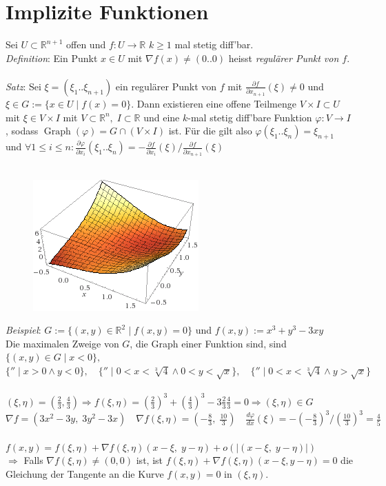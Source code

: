 \documentclass[12pt,a4paper,titlepage]{article}
\renewcommand{\d}{\partial}
\newcommand{\setR}{\mathbb{R}}
\newcommand{\Graph}{\operatorname{Graph}}
\begin{document}
\section*{Implizite Funktionen}
Sei $U\subset\setR^{n+1}$ offen und $f:U\to\setR$ $k\geq 1$ mal stetig diff'bar. \\
\textit{Definition}: Ein Punkt $x\in U$ mit $\nabla f(x)\neq(0..0)$ heisst \emph{regulärer Punkt von $f$}. \\
\\
\textit{Satz}: Sei $\xi=(\xi_1..\xi_{n+1})$ ein regulärer Punkt von $f$ mit $\frac{\d f}{\d x_{n+1}}(\xi)\neq 0$ und \\
$\xi\in G:=\{x\in U\mid f(x)=0\}$. Dann existieren eine offene Teilmenge $V\times I\subset U$ mit $\xi\in V\times I$ mit $V\subset\setR^n,\; I\subset\setR$ und eine $k$-mal stetig diff'bare Funktion $\varphi:V\to I$, sodass $\Graph(\varphi)=G\cap(V\times I)$ ist. Für die gilt also $\varphi(\xi_1..\xi_n)=\xi_{n+1}$ und $\forall 1\leq i\leq n: \frac{\d\varphi}{\d x_i}(\xi_1..\xi_n)=-\frac{\d f}{\d x_i}(\xi)/\frac{\d f}{\d x_{n+1}}(\xi)$ \\
\\
\begin{figure}[h!]
  \begin{center}
    \includegraphics{WolframAlpha--x_3_y_3_3xy__3D_plot__2014_03_24_0348.png}
  \end{center}
\end{figure}
\textit{Beispiel}: $G:=\{(x,y)\in\setR^2\mid f(x,y)=0\}$ und $f(x,y):=x^3+y^3-3xy$ \\
Die maximalen Zweige von $G$, die Graph einer Funktion sind, sind $\{(x,y)\in G\mid x<0\},\quad $\\
$\{''\mid x>0\land y<0\},\quad \{''\mid 0<x<\sqrt[3]{4}\land 0<y<\sqrt{x}\},\quad \{''\mid 0<x<\sqrt[3]{4}\land y>\sqrt{x}\}$ \\
\\
$(\xi,\eta)=(\frac{2}{3},\frac{4}{3}) \Rightarrow f(\xi,\eta)=(\frac{2}{3})^3+(\frac{4}{3})^3-3\frac{2}{3}\frac{4}{3}=0 \Rightarrow (\xi,\eta)\in G$ \\
$\nabla f=(3x^2-3y,\; 3y^2-3x) \quad \nabla f(\xi,\eta)=(-\frac{8}{3},\;\frac{10}{3}) \quad \frac{d\varphi}{d x}(\xi)=-(-\frac{8}{3})^3/(\frac{10}{3})^3=\frac{4}{5}$ \\
\\
$f(x,y)=f(\xi,\eta)+\nabla f(\xi,\eta)(x-\xi,\;y-\eta)+o(|(x-\xi,\;y-\eta)|)$ \\
$\Rightarrow$ Falls $\nabla f(\xi,\eta)\neq(0,0)$ ist, ist $f(\xi,\eta)+\nabla f(\xi,\eta)(x-\xi,y-\eta)=0$ die Gleichung der Tangente an die Kurve $f(x,y)=0$ in $(\xi,\eta)$.
\end{document}
